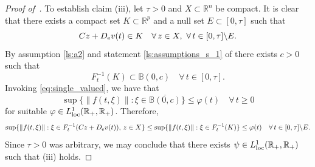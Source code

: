 \documentclass[a4paper,11pt]{article}
\newcommand{\B}{\mathbb B}
\newcommand{\R}{\mathbb R}
\numberwithin{equation}{section}
\numberwithin{figure}{section}
\numberwithin{table}{section}
\begin{document}
\begin{proof}[Proof of~]
To establish claim (iii), let $\tau>0$ and $X\subset\R^n$ be compact. It is clear that there exists a compact set $K\subset\R^p$ and a null set $E\subset [0,\tau]$ such that
\[
Cz+D_{\rm e}v(t)\in K\quad\forall\,z\in X,\,\,\forall\,t\in [0,\tau]\backslash E.
\]
By assumption \ref{ls:a2} and statement \ref{ls:assumptions_s_1} of  there exists $c>0$ such that
\[
F_t^{-1}(K)\subset\B(0,c)\quad\forall\,t\in [0,\tau].
\]
Invoking \eqref{eq:single_valued}, we have that
\[
\sup\{\|f(t,\xi)\|:\xi\in\overline{\B(0,c)}\}\leq\varphi(t)\quad\forall\,t\geq 0
\]
for suitable $\varphi\in L^1_{\rm loc}(\R_+,\R_+)$. Therefore,
\[
\sup\{\|f(t,\xi)\|:\xi\in F_t^{-1}(Cz+D_{\rm e}v(t)),\, z\in X\}
\leq \sup\{\|f(t,\xi)\|:\xi\in F_t^{-1}(K)\}\leq\varphi(t)
\quad\forall\,t\in[0,\tau]\backslash E.
\]
Since $\tau>0$ was arbitrary, we may conclude that there exists $\psi\in L^1_{\rm loc}(\R_+,\R_+)$
such that (iii) holds.


\end{proof}
\end{document}
